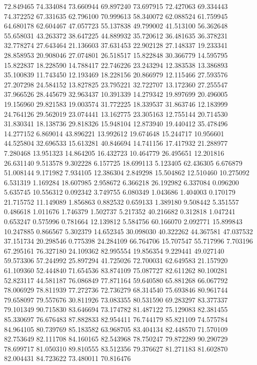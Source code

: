 72.849465
74.334084
73.660944
69.897240
73.697915
72.427063
69.334443
74.372252
67.331635
62.796100
70.999613
58.340072
62.088524
61.759945
64.680178
62.604467
47.057723
55.137838
49.799002
41.513100
56.362648
55.658031
43.263372
38.647225
44.889932
35.720612
36.481635
36.378231
32.778274
27.643464
21.136603
37.631453
22.902128
27.148337
19.233341
28.858953
20.908046
27.074801
26.518517
15.822848
30.366779
14.595795
15.822837
18.228590
14.788417
22.746226
23.243294
12.383538
13.386893
35.100839
11.743450
12.193469
18.228156
20.866979
12.115466
27.593576
27.207298
24.584152
13.827825
23.795221
32.722707
13.172360
27.255547
37.966526
28.445679
32.963437
10.391339
14.279342
19.897699
20.496005
19.156960
29.821583
19.003574
31.772225
18.339537
31.863746
12.183999
24.764126
29.562019
23.074441
13.162775
23.305163
12.755144
20.714530
31.830341
18.138736
29.818326
15.948104
12.873940
19.440412
35.478496
14.277152
6.869014
43.896221
13.992612
19.674648
15.244717
10.956601
44.525804
32.696533
15.613281
40.846694
14.741156
17.417932
21.288977
7.280468
13.951323
14.864205
16.432723
10.464779
26.495651
12.201816
26.631140
9.513578
9.302228
6.157725
18.699113
5.123405
62.436305
6.676879
51.008144
9.171982
7.934105
12.386304
2.849298
15.504862
12.510460
10.275092
6.531319
1.169284
18.607985
2.958672
6.366218
26.192982
6.337084
0.096200
5.635745
10.556312
0.092342
3.749755
6.080349
1.043686
1.404003
0.170179
21.715752
11.149089
1.856863
0.882532
0.659133
1.389180
9.508442
5.351557
0.486618
1.011676
1.746379
1.502737
5.217352
40.216682
0.312818
1.047241
0.653247
0.575996
0.781664
12.139812
5.584756
60.166070
2.092771
15.899843
10.247885
0.866567
5.302379
14.652345
30.098030
40.322262
44.367581
47.037532
37.151734
20.298546
0.775398
24.284109
66.764706
15.707547
55.717996
7.703196
67.295161
76.327180
24.109362
82.995554
19.856354
9.229441
49.027140
59.573306
57.244992
25.897294
41.725026
72.700031
62.649583
21.157920
61.109360
52.444840
71.654536
83.874109
75.087727
82.611262
80.100281
52.823117
44.581187
76.086849
77.871164
59.640580
65.881268
66.067792
78.006929
78.811939
77.272736
72.736279
68.314540
75.693846
80.961744
79.658097
79.557676
30.811926
73.083355
80.531590
69.283297
83.377337
79.101349
90.715830
83.646694
73.174782
81.487122
75.129083
82.381455
85.330697
76.676483
87.882833
82.954411
76.744179
85.821109
74.575784
84.964105
80.739769
85.183582
63.968705
83.404134
82.448570
71.570109
82.753649
82.111708
84.160165
82.543968
78.750247
79.872289
90.290729
78.699717
81.050310
89.810555
83.512356
79.376627
81.271183
81.602870
82.004431
84.723622
73.480011
70.816476
